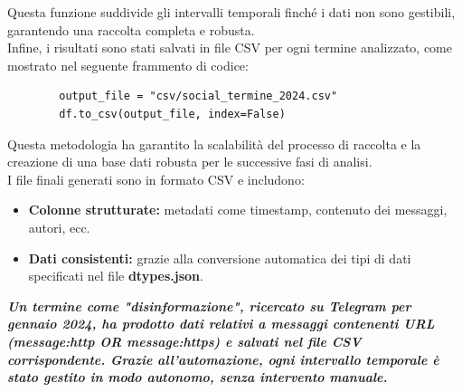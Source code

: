 \documentclass[12pt]{article}
\begin{document}
	Questa funzione suddivide gli intervalli temporali finché i dati non sono gestibili, garantendo una raccolta completa e robusta.\\
	Infine, i risultati sono stati salvati in file CSV per ogni termine analizzato, come mostrato nel seguente frammento di codice:
	\begin{lstlisting}
		output_file = "csv/social_termine_2024.csv"
		df.to_csv(output_file, index=False)
	\end{lstlisting}
	Questa metodologia ha garantito la scalabilità del processo di raccolta e la creazione di una base dati robusta per le successive fasi di analisi.\\
	I file finali generati sono in formato CSV e includono:
	\begin{itemize}
		\item \textbf{Colonne strutturate:} metadati come timestamp, contenuto dei messaggi, autori, ecc.
		\item \textbf{Dati consistenti:} grazie alla conversione automatica dei tipi di dati specificati nel file \textbf{dtypes.json}.
	\end{itemize}
	\textbf{\textit{Un termine come "disinformazione", ricercato su Telegram per gennaio 2024, ha prodotto dati relativi a messaggi contenenti URL (message:http OR message:https) e salvati nel file CSV corrispondente. Grazie all'automazione, ogni intervallo temporale è stato gestito in modo autonomo, senza intervento manuale.}}
\end{document}
